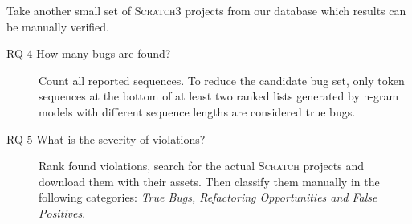 \documentclass[
    numbers=noenddot,
    parskip=half-,
    fontsize=12pt,
    paper=a4,
    oneside,
    titlepage,
    bibliography=totoc,
    chapterprefix=false,
]{scrbook}
\newcommand{\scratch}{\textsc{Scratch}}
\begin{document}
	Take another small set of \scratch{3} projects from our database which results can be manually verified.
	
    \begin{description}
        \item[RQ 4 How many bugs are found?] 
        Count all reported sequences. To reduce the candidate bug set, only token sequences at the bottom of at least two ranked lists generated by n-gram models with different sequence lengths are considered true bugs.
        \item[RQ 5 What is the severity of violations?] 
        Rank found violations, search for the actual \scratch{} projects and download them with their assets. Then classify them manually in the following categories: \textit{True Bugs, Refactoring Opportunities and False Positives}.
    \end{description}
 


    \backmatter

    \printbibliography
    
\end{document}
